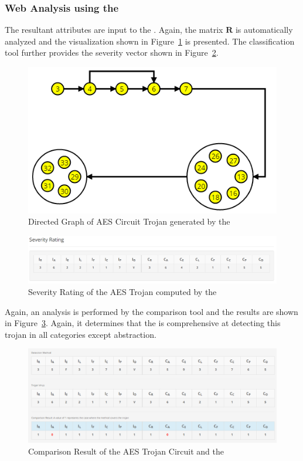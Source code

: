 \subsubsection{Web Analysis using the \WebName}
The resultant attributes are input to the \WebName.
Again, the matrix $\mathbf{R}$ is automatically analyzed and the visualization shown in Figure~\ref{fig:aesVisual} is presented. 
The classification tool further provides the severity vector shown in Figure~\ref{fig:aesSeverity}.
\begin{figure}[h]
\centering
\includegraphics[width=0.7\linewidth]{Figures/aesVisual}
\caption{Directed Graph of AES Circuit Trojan generated by the \WebName}
\label{fig:aesVisual}
\end{figure}
\begin{figure}[h]
\centering
\includegraphics[width=1\linewidth]{Figures/aesSeverity}
\caption{Severity Rating of the AES Trojan computed by the \WebName}
\label{fig:aesSeverity}
\end{figure}
Again, an analysis is performed by the comparison tool and the results are shown in Figure~\ref{fig:aesComparison}.
Again, it determines that the \NameNoPeriod is comprehensive at detecting this trojan in all categories except abstraction.
\begin{figure}[h]
\centering
\includegraphics[width=1\linewidth]{Figures/aesComparison}
\caption[Comparison Result of the AES Trojan Circuit and the \Name]{Comparison Result of the AES Trojan Circuit and the \Name}
\label{fig:aesComparison}
\end{figure}
